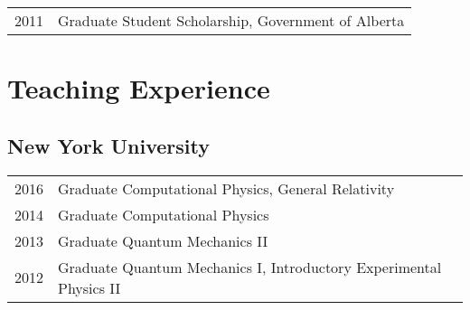 \documentclass[letterpaper]{article}
\renewenvironment{itemize}{
  \begin{list}{}{
    \setlength{\leftmargin}{1.5em}
  }
}{
  \end{list}
}
\begin{document}
\begin{itemize}
\item \begin{tabular}{ll}
2011 & Graduate Student Scholarship, Government of Alberta \\
\end{tabular}

%
%
%
%
%
%
%
%

\end{itemize}

\section*{Teaching Experience}
\subsection*{New York University}
\begin{itemize}
\item \begin{tabular}{ll}
2016 & Graduate Computational Physics, General Relativity \\
2014 & Graduate Computational Physics \\
2013 & Graduate Quantum Mechanics II \\
2012 & Graduate Quantum Mechanics I, Introductory Experimental Physics II
\end{tabular}
\end{itemize}
\end{document}
